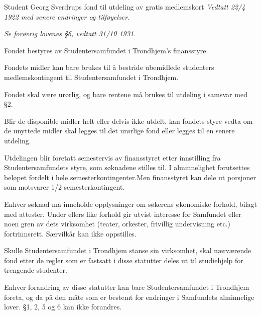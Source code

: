 \begin{fond}{Student Georg Sverdrups fond til utdeling av gratis medlemskort}
    \emph{Vedtatt 22/4 1922 med senere endringer og tilføyelser.}

    \emph{Se forøvrig lovenes §6, vedtatt 31/10 1931.}

  \begin{fondsparagraf}
  Fondet bestyres av Studentersamfundet i Trondhjem's finansstyre.
  \end{fondsparagraf}
  
  \begin{fondsparagraf}
Fondets midler kan bare brukes til å bestride ubemidlede studenters medlemskontingent til Studentersamfundet i
Trondhjem.
  \end{fondsparagraf}
  
  \begin{fondsparagraf}
Fondet skal være urørlig, og bare rentene må brukes til utdeling i samsvar med §2.

Blir de disponible midler helt eller delvis ikke utdelt, kan fondets styre vedta om de unyttede midler skal legges til det
urørlige fond eller legges til en senere utdeling.
  \end{fondsparagraf}

  \begin{fondsparagraf}
Utdelingen blir foretatt semestervis av finansstyret etter innstilling fra Studentersamfundets styre, som søknadene
stilles til. I alminnelighet forutsettes beløpet fordelt i hele semesterkontingenter.Men finansstyret kan dele ut porsjoner
som motsvarer 1/2 semesterkontingent.
  \end{fondsparagraf}
  
  \begin{fondsparagraf}
Enhver søknad må inneholde opplysninger om søkerens økonomiske forhold, bilagt med attester. Under ellers like
forhold gir utvist interesse for Samfundet eller noen gren av dets virksomhet (teater, orkester, frivillig undervisning
etc.) fortrinnsrett. Særvilkår kan ikke oppstilles.
  \end{fondsparagraf}
  
  \begin{fondsparagraf}
Skulle Studentersamfundet i Trondhjem stanse sin virksomhet, skal nærværende fond etter de regler som er fastsatt i
disse statutter deles ut til studiehjelp for trengende studenter.
  \end{fondsparagraf}
  
  \begin{fondsparagraf}
Enhver forandring av disse statutter kan bare Studentersamfundet i Trondhjem foreta, og da på den måte som er
bestemt for endringer i Samfundets alminnelige lover. §1, 2, 5 og 6 kan ikke forandres.
  \end{fondsparagraf}
  
\end{fond}



